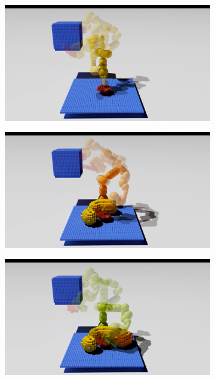 \documentclass[a4paper]{report}
\begin{document}
\begin{figure}[t]
    \centering
    \begin{subfigure}{0.48\textwidth}
         \includegraphics[trim={8cm 0 10cm 1cm},clip, width=\textwidth]{path1.png}
        \caption{}
        \label{fig:pr1}
    \end{subfigure} 
    \begin{subfigure}{0.48\textwidth}
         \includegraphics[trim={8cm 0 10cm 1cm},clip, width=\textwidth]{path2.png}
        \caption{}
        \label{fig:pr2}
    \end{subfigure}
    \begin{subfigure}{0.48\textwidth}
         \includegraphics[trim={8cm 0 10cm 1cm},clip, width=\textwidth]{path3.png}

\end{subfigure}
\end{figure}
\end{document}
